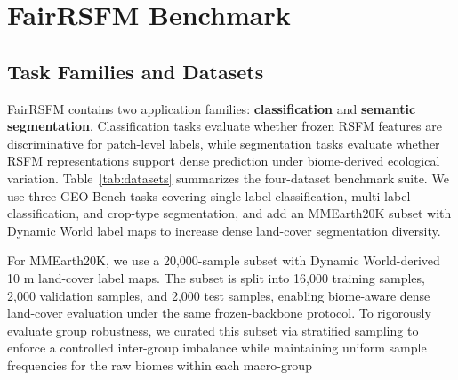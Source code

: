 \documentclass[10pt,twocolumn,letterpaper]{article}
\newcommand{\method}{FairRSFM\xspace}
\begin{document}
\section{FairRSFM Benchmark}

\subsection{Task Families and Datasets}

\method contains two application families: \textbf{classification} and \textbf{semantic segmentation}. Classification tasks evaluate whether frozen RSFM features are discriminative for patch-level labels, while segmentation tasks evaluate whether RSFM representations support dense prediction under biome-derived ecological variation. Table~\ref{tab:datasets} summarizes the four-dataset benchmark suite. We use three GEO-Bench tasks covering single-label classification, multi-label classification, and crop-type segmentation, and add an MMEarth20K subset with Dynamic World label maps to increase dense land-cover segmentation diversity.

\begin{table}[t]
\centering
\caption{\method dataset suite. GEO-Bench datasets are selected for classification and segmentation; the MMEarth20K subset increases dense land-cover segmentation diversity. Sample counts for GEO-Bench tasks follow the modified benchmark setting.}
\label{tab:datasets}
\end{table}

For MMEarth20K, we use a 20,000-sample subset with Dynamic World-derived 10 m land-cover label maps. The subset is split into 16,000 training samples, 2,000 validation samples, and 2,000 test samples, enabling biome-aware dense land-cover evaluation under the same frozen-backbone protocol. To rigorously evaluate group robustness, we curated this subset via stratified sampling to enforce a controlled inter-group imbalance while maintaining uniform sample frequencies for the raw biomes within each macro-group
\end{document}
